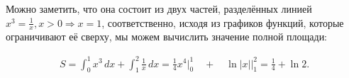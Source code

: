 \documentclass[a4paper,11pt]{article}
\begin{document}
Можно заметить, что она состоит из двух частей, разделённых линией $x^3 = \frac{1}{x}, x > 0 \Rightarrow x = 1$, соответственно, исходя из графиков функций, которые ограничивают её сверху, мы можем вычислить значение полной площади:

\begin{align*}
S = \int_{0}^{1} x^3 \,dx + \int_{1}^{2} \frac{1}{x} \,dx 
= \frac{1}{4} x^4 \bigg\vert_0^1 \quad + \quad \ln |x| \bigg\vert_1^2 
= \frac{1}{4} + \ln 2.
\end{align*}
\end{document}
